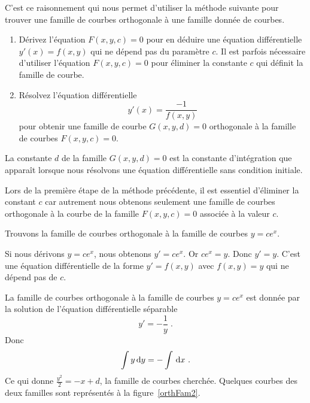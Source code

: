 {C'est ce raisonnement qui nous permet d'utiliser la méthode suivante
pour trouver une famille de courbes orthogonale à une famille donnée
de courbes.

\begin{focus}{\mth}
\begin{enumerate}
\item Dérivez l'équation $F(x,y,c)=0$ pour en déduire une
équation différentielle $y'(x) = f(x,y)$ qui ne dépend pas du
paramètre $c$.  Il est parfois nécessaire d'utiliser l'équation
$F(x,y,c)=0$ pour éliminer la constante $c$ qui définit la famille de
courbe.
\item Résolvez l'équation différentielle
\begin{equation}\label{orth_fam_cond}
y'(x) = \frac{-1}{f(x,y)}
\end{equation}
pour obtenir une famille de courbe $G(x,y,d)=0$ orthogonale à la
famille de courbes $F(x,y,c)=0$.
\end{enumerate}
La constante $d$ de la famille $G(x,y,d)=0$ est la constante
d'intégration que apparaît lorsque nous résolvons une équation
différentielle sans condition initiale.
\end{focus}

Lors de la première étape de la méthode précédente, il est essentiel
d'éliminer la constant $c$ car autrement nous obtenons seulement une
famille de courbes orthogonale à la courbe de la famille
$F(x,y,c)=0$ associée à la valeur $c$.

\begin{egg}
Trouvons la famille de courbes orthogonale à la famille de courbes $y=c
e^x$.

Si nous dérivons $y=c e^x$, nous obtenons $y'= c e^x$.  Or $c e^x = y$.
Donc $y'= y$.  C'est une équation différentielle de la forme
$y'= f(x,y)$ avec $f(x,y) = y$ qui ne dépend pas de $c$.

La famille de courbes orthogonale à la famille de courbes $y=ce^x$ est
donnée par la solution de l'équation différentielle séparable
\[
y'= - \frac{1}{y} \; .
\]
Donc
\[
\int y \dx{y} = - \int \dx{x} \ .
\]
Ce qui donne $\displaystyle \frac{y^2}{2} = - x + d$, la famille de
courbes cherchée.  Quelques courbes des deux familles sont représentés
à la figure~\ref{orthFam2}.
\end{egg}


}
